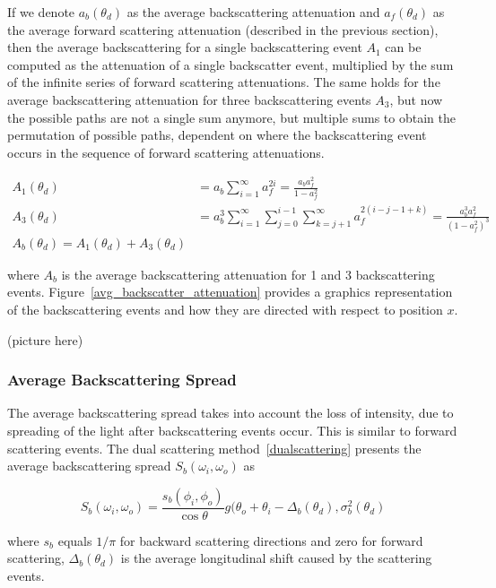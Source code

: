 If we denote $a_b(\theta_d)$ as the average backscattering attenuation and $a_f(\theta_d)$ as the average forward scattering attenuation (described in the previous section), then the average backscattering for a single backscattering event $A_1$ can be computed as the attenuation of a single backscatter event, multiplied by the sum of the infinite series of forward scattering attenuations. The same holds for the average backscattering attenuation for three backscattering events $A_3$, but now the possible paths are not a single sum anymore, but multiple sums to obtain the permutation of possible paths, dependent on where the backscattering event occurs in the sequence of forward scattering attenuations.

\begin{align}
A_1(\theta_d) &= a_b \sum_{i=1}^{\infty} a_f^{2i} = \frac{a_b a_f^2}{1 - a_f^2} \\
A_3(\theta_d) &= a_b^3 \sum_{i=1}^{\infty}  \sum_{j=0}^{i-1} \sum_{k=j+1}^{\infty} a_f^{2(i-j-1+k)} = \frac{a_b^3 a_f^2}{(1 - a_f^2)^3} \\
A_b(\theta_d) = A_1(\theta_d) + A_3(\theta_d)
\end{align}

where $A_b$ is the average backscattering attenuation for 1 and 3 backscattering events. Figure~\ref{avg_backscatter_attenuation} provides a graphics representation of the backscattering events and how they are directed with respect to position $x$.

(picture here)

\subsubsection{Average Backscattering Spread}

The average backscattering spread takes into account the loss of intensity, due to spreading of the light after backscattering events occur. This is similar to forward scattering events. The dual scattering method~\ref{dualscattering} presents the average backscattering spread $S_b(\omega_i, \omega_o)$ as

\begin{equation}
S_b(\omega_i, \omega_o) = \frac{s_b(\phi_i, \phi_o)}{\cos \theta} g(\theta_o + \theta_i - \Delta_b(\theta_d), \sigma_b^2(\theta_d)
\end{equation}

where $s_b$ equals $1/\pi$ for backward scattering directions and zero for forward scattering, $\Delta_b(\theta_d)$ is the average longitudinal shift caused by the scattering events.

